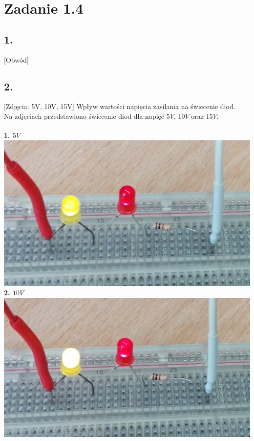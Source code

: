 \documentclass[polish,a4paper]{article}
\begin{document}
\section{Zadanie 1.4}


\subsection*{1.} [Obwód]
\newline

\subsection*{2.} [Zdjęcia: 5V, 10V, 15V]
Wpływ wartości napięcia zasilania na świecenie diod.\\
Na zdjęciach przedstawiono świecenie diod dla napięć $5V$, $10V$ oraz $15V$.\\
\\
\textbf{1. $5V$}\\
\includegraphics[width=\textwidth]{5v}
\\
\textbf{2. $10V$}\\
\includegraphics[width=\textwidth]{10v}
\end{document}
